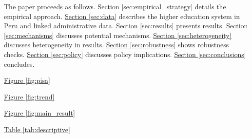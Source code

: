 The paper proceeds as follows. \hyperref[sec:empirical_strategy]{Section \ref{sec:empirical_strategy}} details the empirical approach. \hyperref[sec:data]{Section \ref{sec:data}}  describes the higher education system in Peru and linked administrative data. \hyperref[sec:results]{Section \ref{sec:results}} presents results. \hyperref[sec:mechanisms]{Section \ref{sec:mechanisms}} discusses potential mechanisms. \hyperref[sec:heterogeneity]{Section \ref{sec:heterogeneity}} discusses heterogeneity in results. \hyperref[sec:robustness]{Section \ref{sec:robustness}} shows robustness checks. \hyperref[sec:policy]{Section \ref{sec:policy}} discusses policy implications. \hyperref[sec:conclusions]{Section \ref{sec:conclusions}} concludes.



\newpage

\hyperref[fig:pisa]{Figure \ref{fig:pisa}}

\hyperref[fig:trend]{Figure \ref{fig:trend}}


\hyperref[fig:main_result]{Figure \ref{fig:main_result}}


\hyperref[tab:descriptive]{Table \ref{tab:descriptive}}

